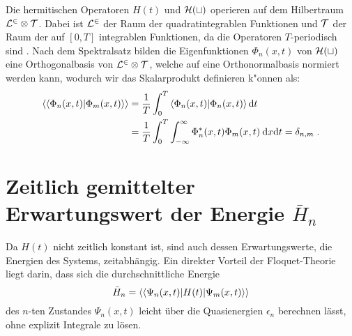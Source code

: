   Die hermitischen Operatoren $H(t)$ und $\cal H(t)$ operieren auf dem Hilbertraum $\cal{L}^2 \otimes \cal{T}$.
  Dabei ist $\cal{L}^2$ der Raum der quadratintegrablen Funktionen und $\cal{T}$ der Raum der auf $[0,T]$ integrablen Funktionen, da die Operatoren $T$-periodisch sind \cite{haengi}.
  Nach dem Spektralsatz bilden die Eigenfunktionen $\Phi_n(x,t)$ von $\cal{H}(t)$ eine Orthogonalbasis von $\cal{L}^2 \otimes \cal{T}$, welche auf eine Orthonormalbasis normiert werden kann, wodurch wir das Skalarprodukt definieren k"onnen als:
  \begin{align}
    \begin{split}
    \braket{\braket{\Phi_n(x,t)|\Phi_m(x,t)}} &= \frac{1}{T} \int_0^T \braket{\Phi_n(x,t)|\Phi_n(x,t)} \text{d}t \\
    &= \frac{1}{T} \int_0^T \int_{-\infty}^{\infty} \Phi_n^*(x,t)\Phi_m(x,t) \: \text{d}x\text{d}t = \delta_{n,m} \; .
    \label{skalarprodukt_einzelner}
    \end{split}
  \end{align}


 \section{\texorpdfstring{Zeitlich gemittelter Erwartungswert der Energie $\bar{H}_n$}{Zeitlich gemittelter Erwartungswert der Energie bar{H}_n}}

    Da $H(t)$ nicht zeitlich konstant ist, sind auch dessen Erwartungswerte, die Energien des Systems, zeitabhängig.
    Ein direkter Vorteil der Floquet-Theorie liegt darin, dass sich die durchschnittliche Energie
    \begin{equation}
      \bar{H}_n  = \braket{\braket{\Psi_n(x,t)|H(t)|\Psi_m(x,t)}}
    \end{equation}
    des $n$-ten Zustandes $\Psi_n(x,t)$ leicht über die Quasienergien $\epsilon_n$ berechnen lässt, ohne explizit Integrale zu lösen.

